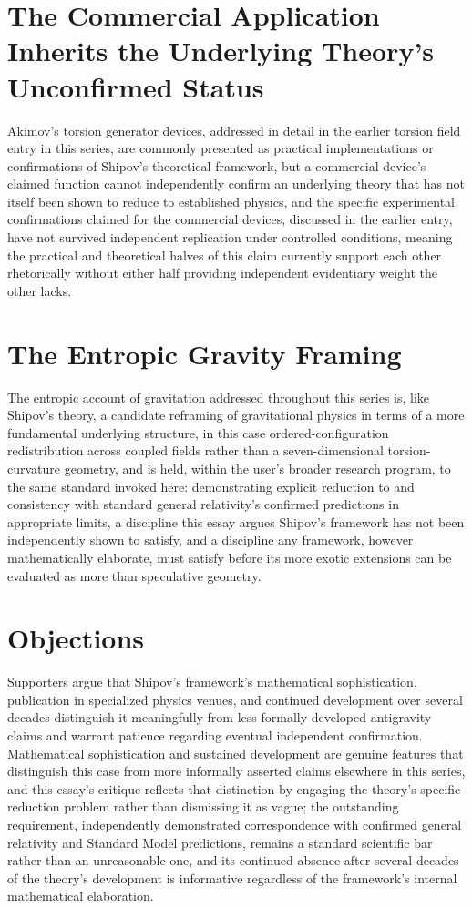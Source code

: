 \documentclass[11pt]{article}
\begin{document}
\section{The Commercial Application Inherits the Underlying Theory's Unconfirmed Status}

Akimov's torsion generator devices, addressed in detail in the earlier torsion field entry in this series, are commonly presented as practical implementations or confirmations of Shipov's theoretical framework, but a commercial device's claimed function cannot independently confirm an underlying theory that has not itself been shown to reduce to established physics, and the specific experimental confirmations claimed for the commercial devices, discussed in the earlier entry, have not survived independent replication under controlled conditions, meaning the practical and theoretical halves of this claim currently support each other rhetorically without either half providing independent evidentiary weight the other lacks.

\section{The Entropic Gravity Framing}

The entropic account of gravitation addressed throughout this series is, like Shipov's theory, a candidate reframing of gravitational physics in terms of a more fundamental underlying structure, in this case ordered-configuration redistribution across coupled fields rather than a seven-dimensional torsion-curvature geometry, and is held, within the user's broader research program, to the same standard invoked here: demonstrating explicit reduction to and consistency with standard general relativity's confirmed predictions in appropriate limits, a discipline this essay argues Shipov's framework has not been independently shown to satisfy, and a discipline any framework, however mathematically elaborate, must satisfy before its more exotic extensions can be evaluated as more than speculative geometry.

\section{Objections}

Supporters argue that Shipov's framework's mathematical sophistication, publication in specialized physics venues, and continued development over several decades distinguish it meaningfully from less formally developed antigravity claims and warrant patience regarding eventual independent confirmation. Mathematical sophistication and sustained development are genuine features that distinguish this case from more informally asserted claims elsewhere in this series, and this essay's critique reflects that distinction by engaging the theory's specific reduction problem rather than dismissing it as vague; the outstanding requirement, independently demonstrated correspondence with confirmed general relativity and Standard Model predictions, remains a standard scientific bar rather than an unreasonable one, and its continued absence after several decades of the theory's development is informative regardless of the framework's internal mathematical elaboration.
\end{document}
